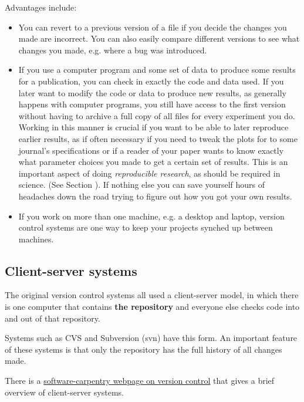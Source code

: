 \documentclass[letterpaper,10pt,english]{sphinxmanual}
\begin{document}
Advantages include:
\begin{itemize}
\item {} 
You can revert to a previous version of a file if you decide the changes
you made are incorrect.  You can also easily compare different versions
to see what changes you made, e.g. where a bug was introduced.

\item {} 
If you use a computer program and some set of data to produce some
results for a publication, you can check in exactly the code and data
used.  If you later want to modify the code or data to produce new results,
as generally happens with computer programs, you still have access to the
first version without having to archive a full copy of all files for
every experiment you do.  Working in this manner is crucial if you want
to be able to later reproduce earlier results, as if often necessary if
you need to tweak the plots for to some journal's specifications or if a
reader of your paper wants to know exactly what parameter choices you
made to get a certain set of results.   This is an important aspect of
doing \emph{reproducible research}, as should be required in science.  (See
Section {\hyperref[reproducibility:reproducibility]{}}).  If nothing else you can save yourself
hours of headaches down the road trying to figure out how you got your
own results.

\item {} 
If you work on more than one machine, e.g. a desktop and laptop, version
control systems are one way to keep your projects synched up between
machines.

\end{itemize}


\subsection{Client-server systems}
\label{versioncontrol:client-server-systems}
The original version control systems all used a client-server model, in
which there is one computer that contains \textbf{the repository} and everyone
else checks code into and out of that repository.

Systems such as CVS and Subversion (svn) have this form.
An important feature of these systems is that only the repository has the
full history of all changes made.

There is a \href{http://software-carpentry.org/4\_0/vc/}{software-carpentry webpage on version control} that gives a brief overview
of client-server systems.
\end{document}
